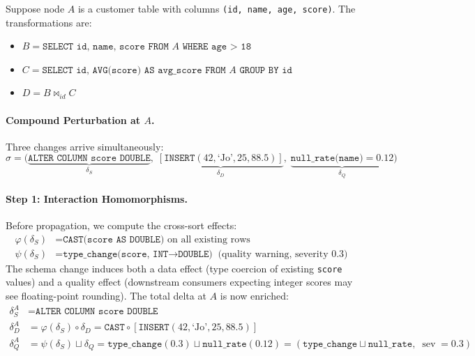 \documentclass[sigplan,screen,nonacm]{acmart}
\newcommand{\compose}{\mathbin{\circ}}
\newcommand{\severity}{\operatorname{sev}}
\begin{document}
Suppose node $A$ is a customer table with columns \texttt{(id, name,
age, score)}.  The transformations are:
\begin{itemize}
\item $B = \texttt{SELECT id, name, score FROM } A \texttt{ WHERE age > 18}$
\item $C = \texttt{SELECT id, AVG(score) AS avg\_score FROM } A \texttt{ GROUP BY id}$
\item $D = B \bowtie_{id} C$
\end{itemize}

\paragraph{Compound Perturbation at $A$.}
Three changes arrive simultaneously:
\[
  \sigma = \bigl(\underbrace{\texttt{ALTER COLUMN score DOUBLE}}_{\delta_S},\;
           \underbrace{[\texttt{INSERT}(42,\text{`Jo'},25,88.5)]}_{\delta_D},\;
           \underbrace{\texttt{null\_rate(name)} = 0.12}_{\delta_Q}\bigr)
\]

\paragraph{Step 1: Interaction Homomorphisms.}
Before propagation, we compute the cross-sort effects:
\begin{align*}
\varphi(\delta_S) &= \texttt{CAST(score AS DOUBLE)} \text{ on all existing rows}\\
\psi(\delta_S) &= \texttt{type\_change(score, INT→DOUBLE)} \;\;\text{(quality warning, severity 0.3)}
\end{align*}
The schema change induces both a data effect (type coercion of existing
\texttt{score} values) and a quality effect (downstream consumers expecting
integer scores may see floating-point rounding).  The total delta at $A$ is
now enriched:
\begin{align*}
\delta_S^A &= \texttt{ALTER COLUMN score DOUBLE} \\
\delta_D^A &= \varphi(\delta_S) \compose \delta_D
             = \texttt{CAST} \compose [\texttt{INSERT}(42,\text{`Jo'},25,88.5)] \\
\delta_Q^A &= \psi(\delta_S) \sqcup \delta_Q
             = \texttt{type\_change}(0.3) \sqcup \texttt{null\_rate}(0.12)
             = (\texttt{type\_change} \sqcup \texttt{null\_rate},\; \severity = 0.3)
\end{align*}
\end{document}
